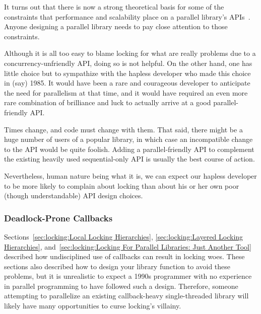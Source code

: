 It turns out that there is now a strong theoretical basis for some of the
constraints that performance and scalability place on a parallel library's
APIs~\cite{HagitAttiya2011LawsOfOrder,Attiya:2011:LOE:1925844.1926442,PaulEMcKenney2011SNC}.
Anyone designing a parallel library needs to pay close attention to
those constraints.

Although it is all too easy to blame locking for what are really problems
due to a concurrency-unfriendly API, doing so is not helpful.
On the other hand, one has little choice but to sympathize with the
hapless developer who made this choice in (say) 1985.
It would have been a rare and courageous developer to anticipate the
need for parallelism at that time, and it would have required an
even more rare combination of brilliance and luck to actually arrive
at a good parallel-friendly API\@.

Times change, and code must change with them.
That said, there might be a huge number of users of a popular library,
in which case an incompatible change to the API would be quite foolish.
Adding a parallel-friendly API to complement the existing heavily used
sequential-only API is usually the best course of action.

Nevertheless, human nature being what it is, we can expect our hapless
developer to be more likely to complain about locking than about his
or her own poor (though understandable) API design choices.

\subsubsection{Deadlock-Prone Callbacks}
\label{sec:locking:Deadlock-Prone Callbacks}

Sections~\ref{sec:locking:Local Locking Hierarchies},
\ref{sec:locking:Layered Locking Hierarchies},
and~\ref{sec:locking:Locking For Parallel Libraries: Just Another Tool}
described how undisciplined use of callbacks can result in locking
woes.
These sections also described how to design your library function to
avoid these problems, but it is unrealistic to expect a 1990s programmer
with no experience in parallel programming to have followed such a design.
Therefore, someone attempting to parallelize an existing callback-heavy
single-threaded library will likely have many opportunities to curse
locking's villainy.

